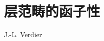 \setcounter{chapter}{2}
\chapter{层范畴的函子性}
\begin{center}
J.-L. Verdier
\end{center}
\label{sga4.exp.III}

